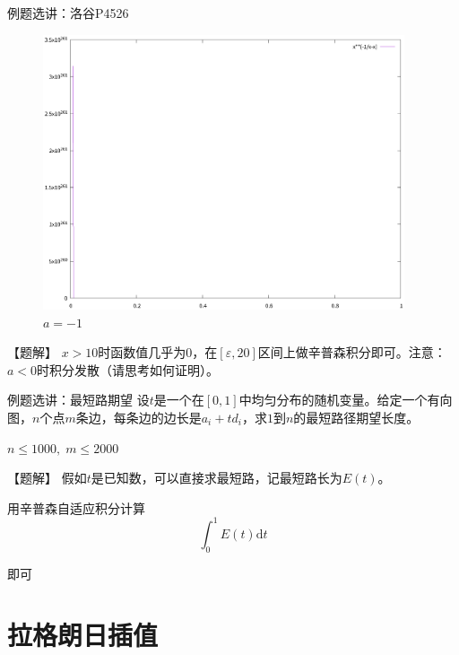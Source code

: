 \documentclass{beamer}
\begin{document}
\begin{frame}{例题选讲：洛谷P4526}
\begin{figure}
\begin{minipage}[t]{0.32\textwidth}
            \caption{$a=10$}
        \end{minipage}
        \begin{minipage}[t]{0.32\textwidth}
            \centering
            \includegraphics[width=0.95\textwidth]{pic/p4526-3.eps}
            \caption{$a=-1$}
        \end{minipage}
    \end{figure}

    \pause
    【题解】 $x>10$时函数值几乎为$0$，在$[\varepsilon,20]$区间上做辛普森积分即可。注意：$a<0$时积分发散（请思考如何证明）。
\end{frame}

\begin{frame}{例题选讲：最短路期望}
    设$t$是一个在$[0,1]$中均匀分布的随机变量。给定一个有向图，$n$个点$m$条边，每条边的边长是$a_i+td_i$，求$1$到$n$的最短路径期望长度。

    $n\leq 1000,\; m\leq 2000$

    \pause
    \vspace{1em}
    【题解】 假如$t$是已知数，可以直接求最短路，记最短路长为$E(t)$。

    \pause
    \vspace{1em}
    用辛普森自适应积分计算
    \begin{equation*}
        \int_0^1 E(t) \text{d} t
    \end{equation*}
    
    即可
\end{frame}

\section{拉格朗日插值}
\end{document}

